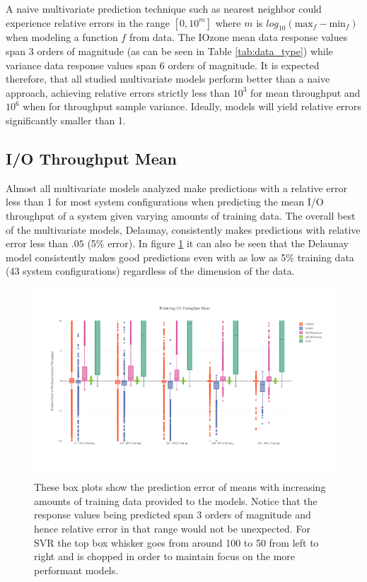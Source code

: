\documentclass{scspaperproc}
\theoremstyle{scsthe}
\begin{document}
A naive multivariate prediction technique such as nearest neighbor
could experience relative errors in the range $[0,10^m]$ where $m$ is
$log_{10}(\text{max}_f - \text{min}_f)$ when modeling a function $f$
from data. The IOzone mean data response values span 3 orders of
magnitude (as can be seen in Table \ref{tab:data_type}) while variance
data response values span 6 orders of magnitude. It is expected
therefore, that all studied multivariate models perform better than a
naive approach, achieving relative errors strictly less than $10^3$
for mean throughput and $10^6$ when for throughput sample
variance. Ideally, models will yield relative errors significantly
smaller than 1.

\subsection{I/O Throughput Mean}

Almost all multivariate models analyzed make predictions with a
relative error less than 1 for most system configurations when
predicting the mean I/O throughput of a system given varying amounts
of training data. The overall best of the multivariate models,
Delaunay, consistently makes predictions with relative error less than
$.05$ (5\% error). In figure \ref{fig:mean_tt_ratio} it can also be
seen that the Delaunay model consistently makes good predictions even
with as low as 5\% training data (43 system configurations) regardless
of the dimension of the data.

\begin{figure}
  \centering
  \includegraphics[width=\textwidth,trim={0 1in 0 1in}]{Mean_TT_Ratio.pdf}
  \caption{These box plots show the prediction error of means with
    increasing amounts of training data provided to the models. Notice
    that the response values being predicted span 3 orders of
    magnitude and hence relative error in that range would not be
    unexpected. For SVR the top box whisker goes from around 100 to 50
    from left to right and is chopped in order to maintain focus on
    the more performant models.}
  \label{fig:mean_tt_ratio}
\end{figure}
\end{document}
